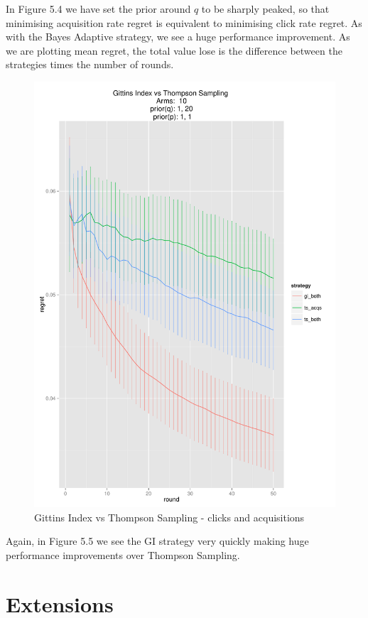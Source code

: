 \documentclass[11pt,a4,singlespacing,titlepagenumber=on]{scrreprt}
\numberwithin{equation}{chapter} %
\theoremstyle{remark}
\begin{document}
In Figure 5.4 we have set the prior around $q$ to be sharply peaked, so that minimising acquisition rate regret is equivalent to minimising click rate regret. As with the Bayes Adaptive strategy, we see a huge performance improvement. As we are plotting mean regret, the total value lose is the difference between the strategies times the number of rounds. 

\begin{figure}[H]
    \centering
    \includegraphics[scale=0.7]{GIBoth.pdf}
    \caption{ Gittins Index vs Thompson Sampling - clicks and acquisitions }
\end{figure}

Again, in Figure 5.5 we see the GI strategy very quickly making huge performance improvements over Thompson Sampling.


\chapter{Extensions}
\end{document}
